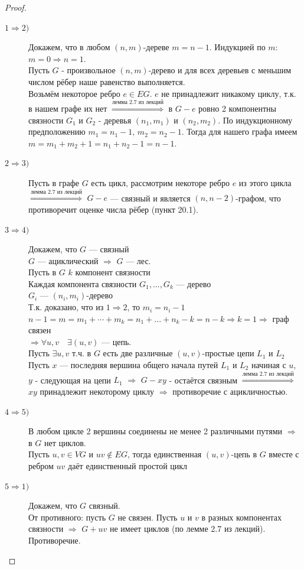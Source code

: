 \documentclass[12pt]{article}
\begin{document}
	\begin{proof}\hfil
		\begin{description}
			\item[$1  \Rightarrow 2)$] Докажем, что в любом $(n,m)$-дереве $m=n-1$. Индукцией по $m$:\\
				$m=0 \Rightarrow n=1$.\\
				Пусть $G$ - произвольное $(n,m)$-дерево и для всех деревьев с меньшим числом рёбер наше равенство выполняется.\\
				Возьмём некоторое ребро $e \in EG$. $e$ не принадлежит никакому циклу, т.к. в нашем графе их нет $\overset{\text{лемма 2.7 из лекций}}{\Rightarrow}$ в $G-e$ ровно 2 компонентны
				связности $G_1$ и $G_2$ - деревья $(n_1,m_1)$ и $(n_2,m_2)$. По индукционному предположению $m_1 = n_1-1, \, m_2=n_2-1$. Тогда для нашего графа имеем
				$m=m_1+m_2+1=n_1+n_2-1=n-1$.
			\item[$2  \Rightarrow 3)$] Пусть в графе $G$ есть цикл, рассмотрим некоторе ребро $e$ из этого цикла $\overset{\text{лемма 2.7 из лекций}}{\Rightarrow} $  $G-e$ — связный и является $(n,n-2)$-графом, что противоречит оценке числа рёбер (пункт 20.1).
			\item[$3  \Rightarrow 4)$] Докажем, что $G$ — связный\\
			$G$ — ациклический $\Rightarrow$ $G$ — лес.\\
			Пусть в $G$ $k$ компонент связности\\
			Каждая компонента связности $G_1,...,G_k$ — дерево\\
			$G_i$ — $(n_i,m_i)$-дерево\\
			Т.к. доказано, что из
				$1 \Rightarrow 2$, то $m_i=n_i - 1$\\
				$n-1 = m = m_1+\dotsb+m_k = n_1+...+n_k-k=n-k \Rightarrow k=1 \Rightarrow $ граф связен\\
				$ \Rightarrow \forall u,v \quad \exists (u,v)$ — цепь.\\
				Пусть $\exists u,v$ т.ч. в $G$ есть две различные $(u,v)$-простые цепи $L_1$ и $L_2$\\
				Пусть $x$ — последняя вершина общего начала путей $L_1$ и $L_2$
				начиная с $u$, $y$ - следующая на цепи $L_1$ $ \Rightarrow $ $G-xy$ - остаётся связным $\overset{\text{лемма 2.7 из лекций}}{ \Rightarrow }$ $xy$ принадлежит
				некоторому циклу $ \Rightarrow $ противоречие с ацикличностью.
			\item[$4  \Rightarrow 5)$] В любом цикле 2 вершины соединены не менее 2 различными путями $ \Rightarrow $ в $G$ нет циклов.\\
			Пусть $u,v \in VG$ и $uv \not\in EG$, тогда единственная $(u,v)$-цепь в $G$ вместе с ребром $uv$ даёт единственный простой цикл
			\item[$5  \Rightarrow 1)$] Докажем, что $G$ связный.\\
			От противного: пусть $G$ не связен. Пусть $u$ и $v$ в разных компонентах связности $ \Rightarrow $
				$G + uv$ не имеет циклов (по лемме 2.7 из лекций). Противоречие.
		\end{description}
	\end{proof}
\end{document}
